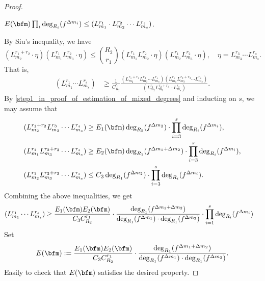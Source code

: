 \begin{proof}
	\begin{step}
		$ E(\bfm) \prod_i \deg_{R_i}(f^{\Delta m_i}) \leq (L_{m_1}^{r_1} \cdot L_{m_2}^{r_2} \cdots L_{m_s}^{r_s})$.
	\end{step}
	By Siu's inequality, we have
	\[ (L_{m_{2}}^{r_{1}+r_2} \cdot \eta) (L_{m_1}^{r_1} L_{m_{3}}^{r_{2}} \cdot \eta) \leq \binom{R_2}{r_{1}} (L_{m_1}^{r_1} L_{m_{2}}^{r_{2}} \cdot \eta) (L_{m_{2}}^{r_{1}} L_{m_{3}}^{r_{2}} \cdot \eta), \quad \eta = L_{m_3}^{r_3} \cdots L_{m_s}^{r_s}. \]
	That is,
	\begin{align*}
		(L_{m_1}^{r_1} \cdots L_{m_s}^{r_s}) & \geq \frac{1}{C_{R_2}^{r_1}} \frac{(L_{m_2}^{r_1+r_2} L_{m_3}^{r_3} \cdots L_{m_s}^{r_s}) (L_{m_1}^{r_1} L_{m_{3}}^{r_{2} + r_3} \cdots L_{m_s}^{r_s})}{(L_{m_2}^{r_1} L_{m_{3}}^{r_{2} + r_3} \cdots L_{m_s}^{r_s})}.
	\end{align*}
	By \cref{step1_in_proof_of_estimation_of_mixed_degrees} and inducting on $s$, we may assume that
	\begin{align*}
		(L_{m_2}^{r_1+r_2} L_{m_3}^{r_3} \cdots L_{m_s}^{r_s})       & \geq E_1(\bfm) \deg_{R_2}(f^{\Delta m_2}) \cdot \prod_{i=3}^{s} \deg_{R_i}(f^{\Delta m_i}),              \\
		(L_{m_1}^{r_1} L_{m_{3}}^{r_{2} + r_3} \cdots L_{m_s}^{r_s}) & \geq E_2(\bfm) \deg_{R_1}(f^{\Delta m_1 + \Delta m_2}) \cdot \prod_{i=3}^{s} \deg_{R_i}(f^{\Delta m_i}), \\
		(L_{m_2}^{r_1} L_{m_{3}}^{r_{2} + r_3} \cdots L_{m_s}^{r_s}) & \leq C_3 \deg_{R_1}(f^{\Delta m_2}) \cdot \prod_{i=3}^{s} \deg_{R_i}(f^{\Delta m_i}).
	\end{align*}
	Combining the above inequalities, we get
	\begin{align*}
		(L_{m_1}^{r_1} \cdots L_{m_s}^{r_s})
		 & \geq
		\frac{E_1(\bfm) E_2(\bfm)}{C_3 C_{R_2}^{r_1}}
		\cdot \frac{\deg_{R_{1}}(f^{\Delta m_{1} + \Delta m_{2}})}{\deg_{R_{1}}(f^{\Delta m_{1}}) \cdot \deg_{R_{1}}(f^{\Delta m_{2}})}
		\cdot \prod_{i=1}^{s} \deg_{R_i}(f^{\Delta m_i})
	\end{align*}
	Set
	\[ E(\bfm) := \frac{E_1(\bfm) E_2(\bfm)}{C_3 C_{R_2}^{r_1}} \cdot \frac{\deg_{R_{1}}(f^{\Delta m_{1} + \Delta m_{2}})}{\deg_{R_{1}}(f^{\Delta m_{1}}) \cdot \deg_{R_{1}}(f^{\Delta m_{2}})}. \]
	Easily to check that $E(\bfm)$ satisfies the desired property.
\end{proof}

